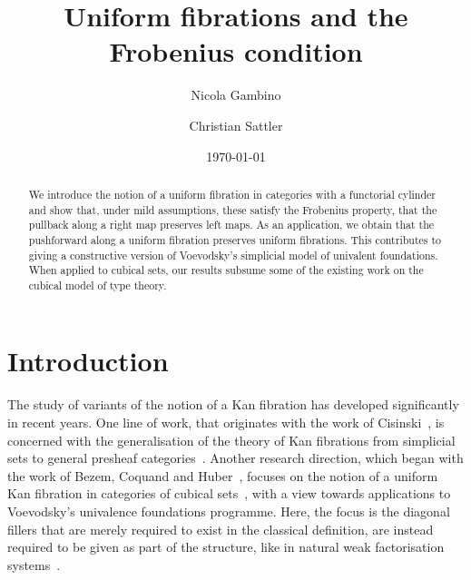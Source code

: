 \documentclass[reqno,10pt,a4paper,oneside,draft]{amsart}
\title{Uniform fibrations and the Frobenius condition}
\begin{document}
\begin{abstract} 
We introduce the notion of a uniform fibration in categories with a functorial cylinder and show that, under mild assumptions, these satisfy the Frobenius property, \ie that the pullback along a right map preserves left maps.
As an application, we obtain that the pushforward along a uniform fibration preserves uniform fibrations.
This contributes to giving a constructive version of Voevodsky's simplicial model of univalent foundations.
When applied to cubical sets, our results subsume some of the existing work on the cubical model of type theory.
\end{abstract}

\author{Nicola Gambino}
\address{School of Mathematics, University of Leeds, Leeds LS2 9JT, UK}

\author{Christian Sattler}
\address{School of Mathematics, University of Leeds, Leeds LS2 9JT, UK}

\date{\today}

\maketitle

\tableofcontents


\section*{Introduction}


The study of variants of the notion of a Kan fibration has developed significantly in recent years.
One line of work, that originates with the work of Cisinski~\cite{cisinski-asterisque}, is concerned with the generalisation of the theory of Kan fibrations from simplicial sets to general presheaf categories~\cite{cisinski-univalence,moerdijk-minimal}.
Another research direction, which began with the work of Bezem, Coquand and Huber~\cite{coquand-cubical-sets}, focuses on the notion of a uniform Kan fibration in categories of cubical sets~\cite{awodey-cubical,coquand-cubical-sets,coquand-variation,huber-thesis,pitts-cubical-nominal,swan-awfs}, with a view towards applications to Voevodsky's univalence foundations programme.
Here, the focus is the diagonal fillers that are merely required to exist in the classical definition, are instead required to be given as part of the structure, like in natural weak factorisation systems~\cite{grandis-tholen-nwfs}.
\end{document}
